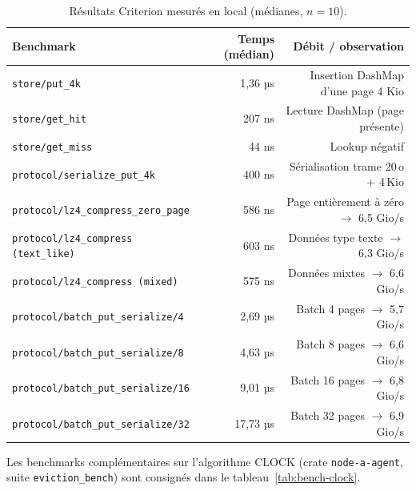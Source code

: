 \begin{table}[H]
\centering
\small
\caption{Résultats Criterion mesurés en local (médianes, $n=10$).}
\begin{tabular}{lrr}
\toprule
\textbf{Benchmark} & \textbf{Temps (médian)} & \textbf{Débit / observation} \\
\midrule
\texttt{store/put\_4k}                          & 1{,}36 µs        & Insertion DashMap d'une page 4 Kio \\
\texttt{store/get\_hit}                         & 207 ns           & Lecture DashMap (page présente) \\
\texttt{store/get\_miss}                        & 44 ns            & Lookup négatif \\
\texttt{protocol/serialize\_put\_4k}            & 400 ns           & Sérialisation trame 20\,o + 4\,Kio \\
\texttt{protocol/lz4\_compress\_zero\_page}     & 586 ns           & Page entièrement à zéro $\to$ 6{,}5 Gio/s \\
\texttt{protocol/lz4\_compress (text\_like)}    & 603 ns           & Données type texte $\to$ 6{,}3 Gio/s \\
\texttt{protocol/lz4\_compress (mixed)}         & 575 ns           & Données mixtes $\to$ 6{,}6 Gio/s \\
\texttt{protocol/batch\_put\_serialize/4}       & 2{,}69 µs        & Batch 4 pages $\to$ 5{,}7 Gio/s \\
\texttt{protocol/batch\_put\_serialize/8}       & 4{,}63 µs        & Batch 8 pages $\to$ 6{,}6 Gio/s \\
\texttt{protocol/batch\_put\_serialize/16}      & 9{,}01 µs        & Batch 16 pages $\to$ 6{,}8 Gio/s \\
\texttt{protocol/batch\_put\_serialize/32}      & 17{,}73 µs       & Batch 32 pages $\to$ 6{,}9 Gio/s \\
\bottomrule
\end{tabular}

\label{tab:bench-criterion}
\end{table}

Les benchmarks complémentaires sur l'algorithme CLOCK (crate \texttt{node-a-agent}, suite \texttt{eviction\_bench}) sont consignés dans le tableau~\ref{tab:bench-clock}.

